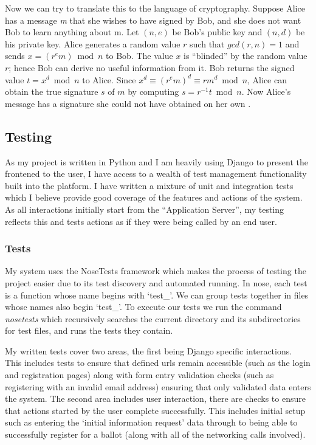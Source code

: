 \documentclass{article}
\begin{document}
	Now we can try to translate this to the language of cryptography. Suppose Alice has a message \textit{m} that she wishes to have signed by Bob, and she does not want Bob to learn anything about m. Let \((n,e)\) be Bob's public key and \((n,d)\) be his private key. Alice generates a random value \(r\) such that \(gcd(r, n) = 1\) and sends \(x = (r^e m) \bmod n\) to Bob. The value \(x\) is ``blinded'' by the random value \(r\); hence Bob can derive no useful information from it. Bob returns the signed value \(t = x^d \bmod n\) to Alice. Since \(x^d \equiv (r^e m)^d \equiv rm^d \bmod n\), Alice can obtain the true signature \(s\) of \(m\) by computing \(s = r^{-1} t \bmod n\). Now Alice's message has a signature she could not have obtained on her own \citep{65_bellovin_2015}.

\clearpage
\subsection{Testing}
As my project is written in Python and I am heavily using Django to present the frontened to the user, I have access to a wealth of test management functionality built into the platform. I have written a mixture of unit and integration tests which I believe provide good coverage of the features and actions of the system. As all interactions initially start from the ``Application Server'', my testing reflects this and tests actions as if they were being called by an end user.

\subsubsection{Tests}
My system uses the NoseTests framework which makes the process of testing the project easier due to its test discovery and automated running. In nose, each test is a function whose name begins with `test\_'. We can group tests together in files whose names also begin `test\_'. To execute our tests we run the command \textit{nosetests} which recursively searches the current directory and its subdirectories for test files, and runs the tests they contain.

My written tests cover two areas, the first being Django specific interactions. This includes tests to ensure that defined urls remain accessible (such as the login and registration pages) along with form entry validation checks (such as registering with an invalid email address) ensuring that only validated data enters the system. The second area includes user interaction, there are checks to ensure that actions started by the user complete successfully. This includes initial setup such as entering the `initial information request' data through to being able to successfully register for a ballot (along with all of the networking calls involved).
\end{document}

